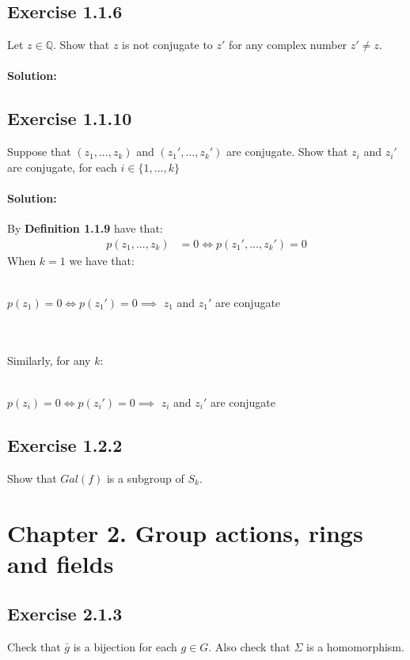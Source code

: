 \documentclass{article}
\begin{document}
\subsection*{Exercise 1.1.6} 
Let $z \in \mathbb{Q}$. Show that $z$ is not conjugate to $z'$ for any complex number $z' \neq z$.

\paragraph{Solution:}

\subsection*{Exercise 1.1.10}
Suppose that $(z_1, ..., z_k)$ and $(z_1', ..., z_k')$ are conjugate. Show that $z_i$ and $z_i'$ are conjugate, for each $i \in \{1, ..., k\}$

\paragraph{Solution:} By \textbf{Definition 1.1.9} have that:
    \begin{equation*}
        \begin{aligned}
            p(z_1, ..., z_k) & = 0 \Longleftrightarrow p(z_1', ..., z_k')=0
        \end{aligned}
    \end{equation*}
\noindent
When $k=1$ we have that:
\\\\
\centerline{$p(z_1)=0 \Longleftrightarrow p(z_1') = 0 \implies$  $z_1$ and $z_1'$ are conjugate}
\\\\
Similarly, for any $k$:
\\\\
\centerline{$p(z_i)=0 \Longleftrightarrow p(z_i') = 0 \implies$  $z_i$ and $z_i'$ are conjugate}

\subsection*{Exercise 1.2.2}
Show that $Gal(f)$ is a subgroup of $S_k$.


\section*{Chapter 2. Group actions, rings and fields}

\subsection*{Exercise 2.1.3}
Check that $\bar g$ is a bijection for each $g \in G$. Also check that $\Sigma$ is a homomorphism.
\end{document}
